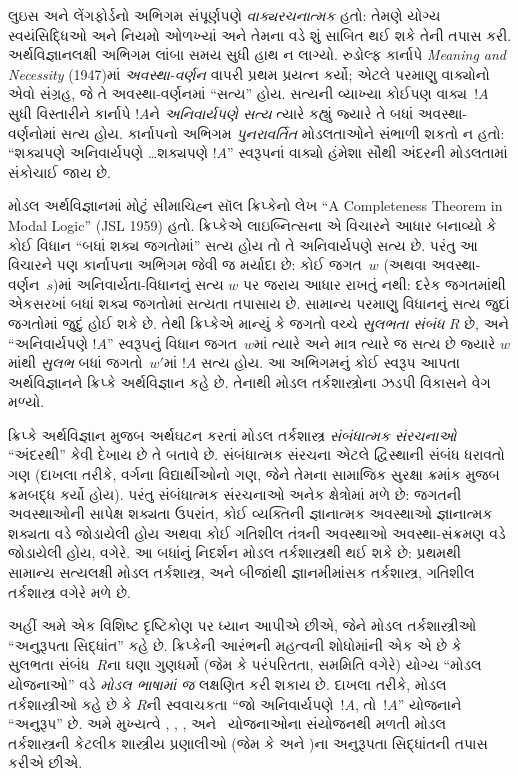 લુઇસ અને લેંગફોર્ડનો અભિગમ સંપૂર્ણપણે \emph{વાક્યરચનાત્મક}
હતો: તેમણે યોગ્ય સ્વયંસિદ્ધિઓ અને નિયમો ઓળખ્યાં અને
તેમના વડે શું સાબિત થઈ શકે તેની તપાસ કરી. અર્થવિજ્ઞાનલક્ષી
અભિગમ લાંબા સમય સુધી હાથ ન લાગ્યો. રુડોલ્ફ કાર્નાપે
\emph{Meaning and Necessity} (1947)માં \emph{અવસ્થા-વર્ણન}
વાપરી પ્રથમ પ્રયત્ન કર્યો; એટલે પરમાણુ વાક્યોનો એવો સંગ્રહ,
જે તે અવસ્થા-વર્ણનમાં ``સત્ય'' હોય. સત્યની વ્યાખ્યા કોઈપણ
વાક્ય~$!A$ સુધી વિસ્તારીને કાર્નાપે $!A$ને \emph{અનિવાર્યપણે
સત્ય} ત્યારે કહ્યું જ્યારે તે બધાં અવસ્થા-વર્ણનોમાં સત્ય હોય.
કાર્નાપનો અભિગમ \emph{પુનરાવર્તિત} મોડલતાઓને સંભાળી શકતો
ન હતો: ``શક્યપણે અનિવાર્યપણે \ldots શક્યપણે $!A$''
સ્વરૂપનાં વાક્યો હંમેશા સૌથી અંદરની મોડલતામાં સંકોચાઈ જાય છે.

મોડલ અર્થવિજ્ઞાનમાં મોટું સીમાચિહ્ન સૉલ ક્રિપ્કેનો લેખ
``A Completeness Theorem in Modal Logic'' (JSL 1959) હતો.
ક્રિપ્કેએ લાઇબ્નિત્સના એ વિચારને આધાર બનાવ્યો કે કોઈ વિધાન
``બધાં શક્ય જગતોમાં'' સત્ય હોય તો તે અનિવાર્યપણે સત્ય છે.
પરંતુ આ વિચારને પણ કાર્નાપના અભિગમ જેવી જ મર્યાદા છે:
કોઈ જગત~$w$ (અથવા અવસ્થા-વર્ણન~$s$)માં
અનિવાર્યતા-વિધાનનું સત્ય $w$ પર જરાય આધાર રાખતું નથી:
દરેક જગતમાંથી એકસરખાં બધાં શક્ય જગતોમાં સત્યતા તપાસાય છે.
સામાન્ય પરમાણુ વિધાનનું સત્ય જુદાં જગતોમાં જુદું હોઈ શકે છે.
તેથી ક્રિપ્કેએ માન્યું કે
જગતો વચ્ચે \emph{સુલભતા સંબંધ} $R$ છે, અને
``અનિવાર્યપણે $!A$'' સ્વરૂપનું વિધાન જગત~$w$માં ત્યારે અને
માત્ર ત્યારે જ સત્ય છે જ્યારે $w$માંથી \emph{સુલભ}
બધાં જગતો~$w'$માં $!A$ સત્ય હોય. આ અભિગમનું કોઈ સ્વરૂપ
આપતા અર્થવિજ્ઞાનને ક્રિપ્કે અર્થવિજ્ઞાન કહે છે. તેનાથી
મોડલ તર્કશાસ્ત્રોના ઝડપી વિકાસને વેગ મળ્યો.

ક્રિપ્કે અર્થવિજ્ઞાન મુજબ અર્થઘટન કરતાં મોડલ તર્કશાસ્ત્ર
\emph{સંબંધાત્મક સંરચનાઓ} ``અંદરથી'' કેવી દેખાય છે તે બતાવે છે.
સંબંધાત્મક સંરચના એટલે દ્વિસ્થાની સંબંધ ધરાવતો ગણ
(દાખલા તરીકે, વર્ગના વિદ્યાર્થીઓનો ગણ, જેને તેમના
સામાજિક સુરક્ષા ક્રમાંક મુજબ ક્રમબદ્ધ કર્યો હોય).
પરંતુ સંબંધાત્મક સંરચનાઓ અનેક ક્ષેત્રોમાં મળે છે:
જગતની અવસ્થાઓની સાપેક્ષ શક્યતા ઉપરાંત, કોઈ વ્યક્તિની
જ્ઞાનાત્મક અવસ્થાઓ જ્ઞાનાત્મક શક્યતા વડે જોડાયેલી હોય
અથવા કોઈ ગતિશીલ તંત્રની અવસ્થાઓ અવસ્થા-સંક્રમણ વડે
જોડાયેલી હોય, વગેરે. આ બધાંનું નિદર્શન મોડલ તર્કશાસ્ત્રથી
થઈ શકે છે: પ્રથમથી સામાન્ય સત્યલક્ષી મોડલ તર્કશાસ્ત્ર,
અને બીજાંથી જ્ઞાનમીમાંસક તર્કશાસ્ત્ર, ગતિશીલ તર્કશાસ્ત્ર
વગેરે મળે છે.

અહીં અમે એક વિશિષ્ટ દૃષ્ટિકોણ પર ધ્યાન આપીએ છીએ, જેને
મોડલ તર્કશાસ્ત્રીઓ ``અનુરૂપતા સિદ્ધાંત'' કહે છે. ક્રિપ્કેની
આરંભની મહત્વની શોધોમાંની એક એ છે કે સુલભતા સંબંધ~$R$ના
ઘણા ગુણધર્મો (જેમ કે પરંપરિતતા, સમમિતિ વગેરે) યોગ્ય
``મોડલ યોજનાઓ'' વડે \emph{મોડલ ભાષામાં જ} લક્ષણિત કરી
શકાય છે. દાખલા તરીકે, મોડલ તર્કશાસ્ત્રીઓ કહે છે કે
$R$ની સ્વવાચકતા ``જો અનિવાર્યપણે~$!A$, તો~$!A$''
યોજનાને ``અનુરૂપ'' છે. અમે મુખ્યત્વે , ,
,  અને~ યોજનાઓના સંયોજનથી મળતી
મોડલ તર્કશાસ્ત્રની કેટલીક શાસ્ત્રીય પ્રણાલીઓ (જેમ કે
 અને )ના અનુરૂપતા સિદ્ધાંતની તપાસ કરીએ છીએ.
\endgroup

